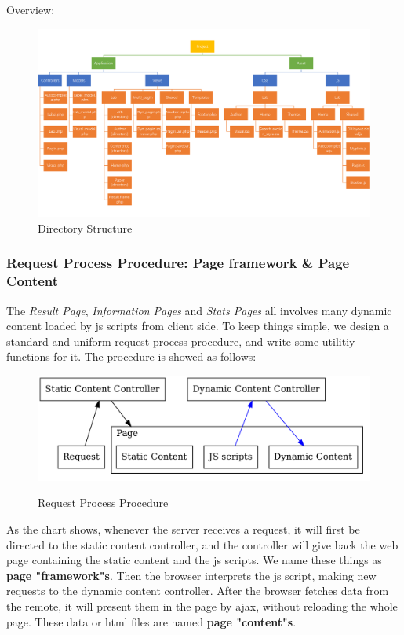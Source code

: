 \documentclass[a4paper, 10pt]{article}
\begin{document}
Overview:
\begin{figure}[H]
  \centering
  \includegraphics[width=\textwidth]{directory.png}
  \caption{Directory Structure}
  \label{fig:web_struct}
\end{figure}

\subsubsection{Request Process Procedure: \textbf{Page framework} \& \textbf{Page Content}}
The \textit{Result Page}, \textit{Information Pages} and \textit{Stats Pages} all involves many dynamic content loaded by js scripts from client side. To keep things simple, we design a standard and uniform request process procedure, and write some utilitiy functions for it.
The procedure is showed as follows:
\begin{figure}[H]
  \centering
  \caption{Request Process Procedure}
  \includegraphics[width=\textwidth]{r_p_p.png}
  \label{fig:r_p_p}
\end{figure}
As the chart shows, whenever the server receives a request, it will first be directed to the static content controller, and the controller will give back the web page containing the static content and the js scripts. We name these things as \textbf{page "framework"s}.
Then the browser interprets the js script, making new requests to the dynamic content controller. After the browser fetches data from the remote, it will present them in the page by ajax, without reloading the whole page. These data or html files are named \textbf{page "content"s}.
\end{document}
